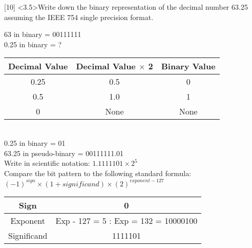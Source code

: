 \documentclass[12pt]{article}
\begin{document}
	
	
	
	\newpage
	
	
	
	
	
	\noindent {} 
	[10] \textless3.5\textgreater Write down the binary representation of the decimal number 63.25 assuming the IEEE 754 single precision format. \vspace{0.15cm} \\
	
	\begin{center}
		63 in binary =  00111111 \\
		0.25 in binary = ? \vspace{0.3cm} \\
		
		
		\begin{tabular}{ |c|c|c| } 
			\hline
			Decimal Value & Decimal Value $\times$ 2 & Binary Value \\
			\hline
			0.25 & 0.5  & 0 \\
			\hline
			0.5  & 1.0  & 1 \\
			\hline
			0    & None & None \\
			\hline
		\end{tabular}
		\vspace{0.3cm} \\
		0.25 in binary = 01 \vspace{0.5cm} \\
		
		63.25 in pseudo-binary = 00111111.01  \vspace{0.5cm} \\
		
		Write in scientific notation: $1.1111101 \times 2^5$ \vspace{0.5cm} \\
		
		Compare the bit pattern to the following standard formula:\\
		
		$(-1)^{sign}\times(1+significand)\times(2)^{exponent - 127}$ \vspace{0.5cm} \\
		
		\begin{tabular}{ |c|c| } 
			\hline
			Sign        & 0 \\
			\hline
			Exponent    & Exp - 127 = 5 : Exp = 132 = 10000100\\
			\hline
			Significand & 1111101 \\
			\hline
		\end{tabular}
		\vspace{0.5cm}  \\
		

\end{center}
\end{document}
